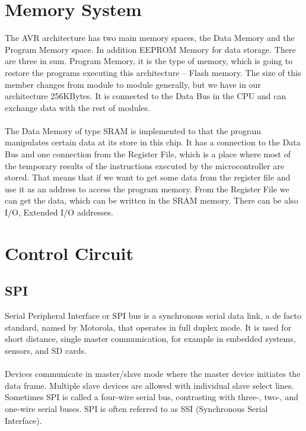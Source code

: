 \documentclass[english]{article}
\begin{document}
\section{Memory System}
The AVR architecture has two main memory spaces, the Data Memory and the Program Memory space. In addition EEPROM Memory for data storage. There are three in sum. Program Memory, it is the type of memory, which is going to restore the programs executing this architecture – Flash memory. The size of this member changes from module to module generally, but we have in our architecture 256KBytes. It is connected to the Data Bus in the CPU and can exchange data with the rest of modules.\\\\
The Data Memory of type SRAM is implemented to that the program manipulates certain data at its store in this chip. It has a connection to the Data Bus and one connection from the Register File, which is a place where most of the temporary results of the instructions executed by the microcontroller are stored. That means that if we want to get some data from the register file and use it as an address to access the program memory. From the Register File we can get the data, which can be written in the SRAM memory. There can be also I/O, Extended I/O addresses.
\section{Control Circuit}
\subsection{SPI}
Serial Peripheral Interface or SPI bus is a synchronous serial data link, a de facto standard, named by Motorola, that operates in full duplex mode. It is used for short distance, single master communication, for example in embedded systems, sensors, and SD cards.\\\\
Devices communicate in master/slave mode where the master device initiates the data frame. Multiple slave devices are allowed with individual slave select lines. Sometimes SPI is called a four-wire serial bus, contrasting with three-, two-, and one-wire serial buses. SPI is often referred to as SSI (Synchronous Serial Interface).
\end{document}
